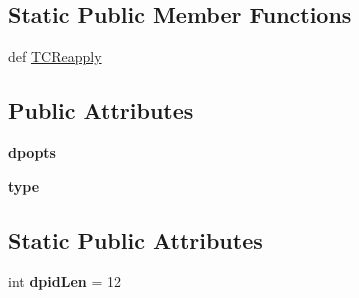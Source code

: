 \subsection*{Static Public Member Functions}
\begin{DoxyCompactItemize}
\item 
def \hyperlink{classmininet_1_1node_1_1UserSwitch_aa1ff2eb96e96a859fc2824445d7f4a8e}{T\-C\-Reapply}
\end{DoxyCompactItemize}
\subsection*{Public Attributes}
\begin{DoxyCompactItemize}
\item 
\hypertarget{classmininet_1_1node_1_1UserSwitch_ae51f38317bcc709effce4661dfb04cef}{{\bfseries dpopts}}\label{classmininet_1_1node_1_1UserSwitch_ae51f38317bcc709effce4661dfb04cef}

\item 
\hypertarget{classmininet_1_1node_1_1UserSwitch_aac7fa7c7e58bab03d13abf27ab3fb1b9}{{\bfseries type}}\label{classmininet_1_1node_1_1UserSwitch_aac7fa7c7e58bab03d13abf27ab3fb1b9}

\end{DoxyCompactItemize}
\subsection*{Static Public Attributes}
\begin{DoxyCompactItemize}
\item 
\hypertarget{classmininet_1_1node_1_1UserSwitch_aba22c07b886451d022841316cbaa5ce8}{int {\bfseries dpid\-Len} = 12}\label{classmininet_1_1node_1_1UserSwitch_aba22c07b886451d022841316cbaa5ce8}

\end{DoxyCompactItemize}


